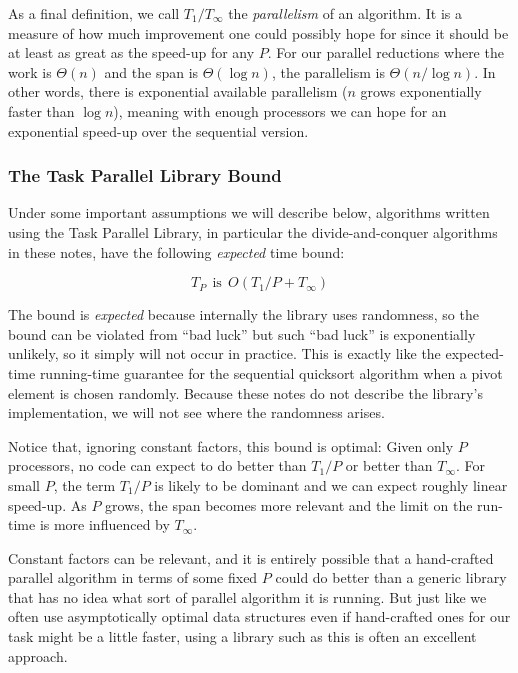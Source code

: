 \documentclass[10pt]{article}
\begin{document}
As a final definition, we call $T_1/T_\infty$ the \emph{parallelism}
of an algorithm.  It is a measure of how much improvement one could
possibly hope for since it should be at least as great as the speed-up
for any $P$.  For our parallel reductions where the work is $\Theta(n)$ and
the span is $\Theta(\log n)$, the parallelism is $\Theta(n/\log n)$.  In
other words, there is exponential available parallelism ($n$ grows
exponentially faster than $\log n$), meaning with enough processors we
can hope for an exponential speed-up over the sequential version.

\subsubsection{The Task Parallel Library Bound}

Under some important assumptions we will describe below, algorithms
written using the Task Parallel Library, in particular the
divide-and-conquer algorithms in these notes, have the following
\emph{expected} time bound:

\[ T_P\ \ \mbox{is}\ \ O(T_1/P + T_\infty) \]

The bound is \emph{expected} because internally the library uses
randomness, so the bound can be violated from ``bad luck'' but such
``bad luck'' is exponentially unlikely, so it simply will not occur in
practice.  This is exactly like the expected-time running-time
guarantee for the sequential quicksort algorithm when a pivot element
is chosen randomly. Because these notes do not describe the
library's implementation, we will not see where the randomness
arises.

Notice that, ignoring constant factors, this bound is optimal:
Given only $P$ processors, no code can expect to do better than
$T_1/P$ or better than $T_\infty$.  For small $P$, the term $T_1/P$ is
likely to be dominant and we can expect roughly linear speed-up.  As
$P$ grows, the span becomes more relevant and the limit on the
run-time is more influenced by $T_\infty$.

Constant factors can be relevant, and it is entirely possible that a
hand-crafted parallel algorithm in terms of some fixed $P$ could do
better than a generic library that has no idea what sort of parallel
algorithm it is running.  But just like we often use asymptotically
optimal data structures even if hand-crafted ones for our task might
be a little faster, using a library such as this is often an excellent
approach.
\end{document}
